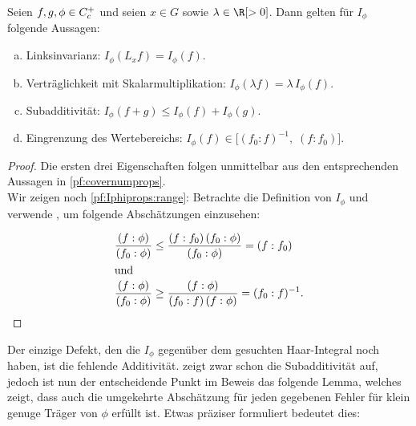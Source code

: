 \begin{thLemma}
    \label{pf:Iphiprops}
    Seien $f,g,\phi \in C_c^+$ und seien $x\in G$ sowie $\lambda\in\R[>0]$.
    Dann gelten für $I_\phi$ folgende Aussagen:
    \begin{enumerate}[a)]
        \item\label{pf:Iphiprops:leftinvariance}
            Linksinvarianz:\quad
            $I_\phi(L_xf) = I_\phi(f)$.
        \item\label{pf:Iphiprops:scalarmult}
            Verträglichkeit mit Skalarmultiplikation:\quad
            $I_\phi(\lambda f) = \lambda \, I_\phi(f)$.
        \item\label{pf:Iphiprops:subadditive}
            Subadditivität:\quad
            $I_\phi(f+g) \leq I_\phi(f) + I_\phi(g)$.
        \item\label{pf:Iphiprops:range}
            Eingrenzung des Wertebereichs:\quad
            $I_\phi(f) \in \bigl[ (f_0 : f)^{-1}, \; (f : f_0) \bigr]$.
    \end{enumerate}
\end{thLemma}

\begin{proof}
    Die ersten drei Eigenschaften folgen unmittelbar aus den entsprechenden 
    Aussagen in \cref{pf:covernumprops}.
    \\
    Wir zeigen noch \ref{pf:Iphiprops:range}: Betrachte die Definition von
    $I_\phi$ und verwende , um folgende
    Abschätzungen einzusehen:

    \begin{align*}
        \frac{(f : \phi)}{(f_0 : \phi)} 
        &\leq \frac{(f : f_0)\,(f_0 : \phi)}{(f_0 : \phi)}
        = (f : f_0)
        \\
        \shortintertext{und}
        \frac{(f : \phi)}{(f_0 : \phi)} 
        &\geq \frac{(f : \phi)}{(f_0 : f)\,(f : \phi)}
        = (f_0 : f)^{-1}
        .
    \end{align*}
\end{proof}

Der einzige Defekt, den die $I_\phi$ gegenüber dem gesuchten Haar-Integral noch
haben, ist die fehlende Additivität.  zeigt
zwar schon die Subadditivität auf, jedoch ist nun der entscheidende Punkt im
Beweis das folgende Lemma, welches zeigt, dass auch die umgekehrte Abschätzung
für jeden gegebenen Fehler für klein genuge Träger von $\phi$ erfüllt ist.
Etwas präziser formuliert bedeutet dies:

